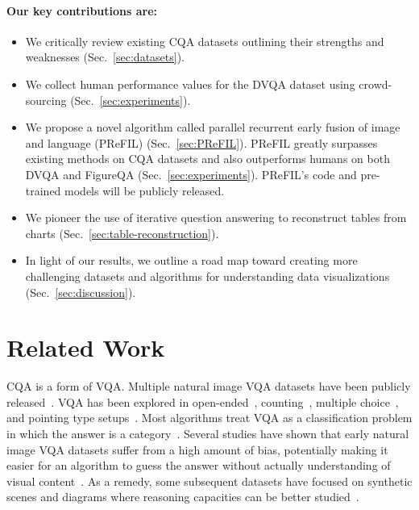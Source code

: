 \documentclass[10pt,twocolumn]{article}
\begin{document}
\paragraph{Our key contributions are:}
\begin{itemize}[noitemsep,nolistsep]
    \item We critically review existing CQA datasets outlining their strengths and weaknesses (Sec.~\ref{sec:datasets}).
    \item We collect human performance values for the DVQA dataset using crowd-sourcing (Sec.~\ref{sec:experiments}).
    \item We propose a novel algorithm called parallel recurrent early fusion of image and language (PReFIL) (Sec.~\ref{sec:PReFIL}). PReFIL greatly surpasses existing methods on CQA datasets and also outperforms humans on both DVQA and FigureQA (Sec.~\ref{sec:experiments}). PReFIL's code and pre-trained models will be publicly released.
    \item We pioneer the use of iterative question answering to reconstruct tables from charts (Sec.~\ref{sec:table-reconstruction}).
    \item In light of our results, we outline a road map toward creating more challenging datasets and algorithms for understanding data visualizations (Sec.~\ref{sec:discussion}).
\end{itemize}



\section{Related Work}



CQA is a form of VQA. Multiple natural image VQA datasets have been publicly released~\cite{malinowski2014multi,antol2015vqa,ren2015image,krishnavisualgenome,kafle2017analysis}. VQA has been explored in open-ended~\cite{antol2015vqa,kafle2016review}, counting~\cite{acharya2019tallyqa}, multiple choice~\cite{antol2015vqa,krishnavisualgenome}, and pointing type setups~\cite{visual7w,acharya2019vqd}. Most algorithms treat VQA as a classification problem in which the answer is a category~\cite{kafle2016review}. Several studies have shown that early natural image VQA datasets suffer from a high amount of bias, potentially making it easier for an algorithm to guess the answer without actually understanding of visual content~\cite{kafle2017analysis,AgrawalBP16,vqacp,kafle2019challenges}. As a remedy, some subsequent datasets have focused on synthetic scenes and diagrams where reasoning capacities can be better studied~\cite{AndreasRDK15,johnson2016clevr,kembhavi2016diagram,Kembhavi2017tqa}. 
\end{document}
